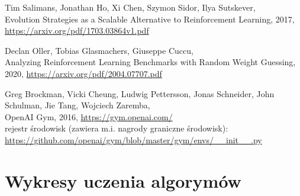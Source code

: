 \documentclass[12pt,a4paper]{article}
\begin{document}
\pagebreak
\begin{thebibliography}{9}
  Tim Salimans, Jonathan Ho, Xi Chen, Szymon Sidor, Ilya Sutskever,\\
  Evolution Strategies as a Scalable Alternative to Reinforcement Learning,
  2017, \href{https://arxiv.org/pdf/1703.03864v1.pdf}{https://arxiv.org/pdf/1703.03864v1.pdf}

  Declan Oller, Tobias Glasmachers, Giuseppe Cuccu, \\
  Analyzing Reinforcement Learning Benchmarks with Random Weight Guessing,
  2020, \href{https://arxiv.org/pdf/2004.07707.pdf}{https://arxiv.org/pdf/2004.07707.pdf}

  Greg Brockman, Vicki Cheung, Ludwig Pettersson, Jonas Schneider, John Schulman, Jie Tang, Wojciech Zaremba,\\
  OpenAI Gym, 2016, \href{https://gym.openai.com/}{https://gym.openai.com/} \\
  rejestr środowisk (zawiera m.i. nagrody graniczne środowisk): \\
  \href{https://github.com/openai/gym/blob/master/gym/envs/\_\_init\_\_.py}{https://github.com/openai/gym/blob/master/gym/envs/\_\_init\_\_.py}

\end{thebibliography}

\pagebreak
\appendix
\section{Wykresy uczenia algorymów}
\end{document}

